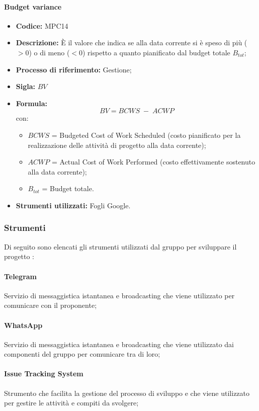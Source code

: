 \paragraph{Budget variance}
\begin{itemize}
	\item \textbf{Codice:} MPC14
	\item \textbf{Descrizione:} È il valore che indica se alla data corrente si è speso di più ($>0$) o di meno ($<0$) rispetto a quanto pianificato dal budget totale $B_{tot}$;
	\item \textbf{Processo di riferimento:} Gestione;
	\item \textbf{Sigla:} $BV$
	\item \textbf{Formula:} $$BV = {BCWS \; - \; ACWP}$$
	con:
	\begin{itemize}
		\item $BCWS$ = Budgeted Cost of Work Scheduled (costo pianificato per la realizzazione delle attività di progetto alla data corrente);
		\item $ACWP$ = Actual Cost of Work Performed (costo effettivamente sostenuto alla data corrente);
		\item $B_{tot}$ = Budget totale.
	\end{itemize}
	\item \textbf{Strumenti utilizzati:} Fogli Google.
\end{itemize}

\subsubsection{Strumenti}
Di seguito sono elencati gli strumenti utilizzati dal gruppo per sviluppare il progetto \glo{\NomeProgetto{}}:

\paragraph{Telegram} 
Servizio di messaggistica istantanea e broadcasting che viene utilizzato per comunicare con il proponente;
\paragraph{WhatsApp} 
Servizio di messaggistica istantanea e broadcasting che viene utilizzato dai componenti del gruppo per comunicare tra di loro;
\paragraph{Issue Tracking System} 
Strumento che facilita la gestione del processo di sviluppo e che viene utilizzato per gestire le attività e compiti da svolgere;
